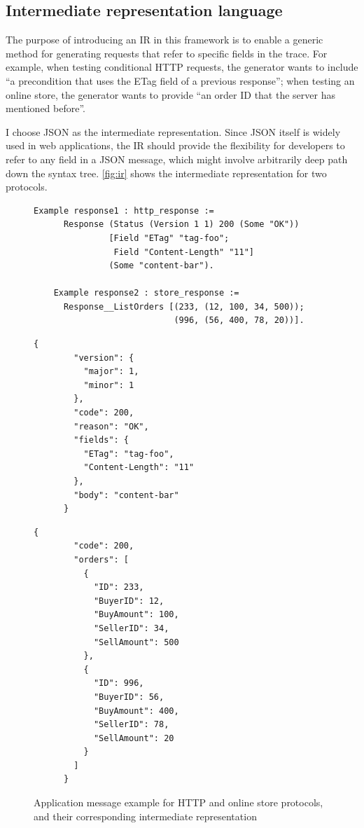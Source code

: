 \documentclass{article}
\theoremstyle{definition}
\begin{document}
\subsection{Intermediate representation language}
The purpose of introducing an IR in this framework is to enable a generic method
for generating requests that refer to specific fields in the trace.  For
example, when testing conditional HTTP requests, the generator wants to include
``a precondition that uses the ETag field of a previous response''; when testing
an online store, the generator wants to provide ``an order ID that the server
has mentioned before''.

I choose JSON as the intermediate representation.  Since JSON itself is widely
used in web applications, the IR should provide the flexibility for developers
to refer to any field in a JSON message, which might involve arbitrarily deep
path down the syntax tree.  \autoref{fig:ir} shows the intermediate
representation for two protocols.

\begin{figure}
  \begin{lstlisting}[style=customcoq]
    Example response1 : http_response :=
      Response (Status (Version 1 1) 200 (Some "OK"))
               [Field "ETag" "tag-foo";
                Field "Content-Length" "11"]
               (Some "content-bar").

    Example response2 : store_response :=
      Response__ListOrders [(233, (12, 100, 34, 500));
                            (996, (56, 400, 78, 20))].
  \end{lstlisting}
  \begin{minipage}[t]{.4\textwidth}
    \begin{lstlisting}[style=json]
      {
        "version": {
          "major": 1,
          "minor": 1
        },
        "code": 200,
        "reason": "OK",
        "fields": {
          "ETag": "tag-foo",
          "Content-Length": "11"
        },
        "body": "content-bar"
      }
    \end{lstlisting}
  \end{minipage}%
  \begin{minipage}[t]{.4\textwidth}
    \begin{lstlisting}[style=json]
      {
        "code": 200,
        "orders": [
          {
            "ID": 233,
            "BuyerID": 12,
            "BuyAmount": 100,
            "SellerID": 34,
            "SellAmount": 500
          },
          {
            "ID": 996,
            "BuyerID": 56,
            "BuyAmount": 400,
            "SellerID": 78,
            "SellAmount": 20
          }
        ]
      }
    \end{lstlisting}
  \end{minipage}
  \caption{Application message example for HTTP and online store protocols, and
    their corresponding intermediate representation}
  \label{fig:ir}
\end{figure}
\end{document}

